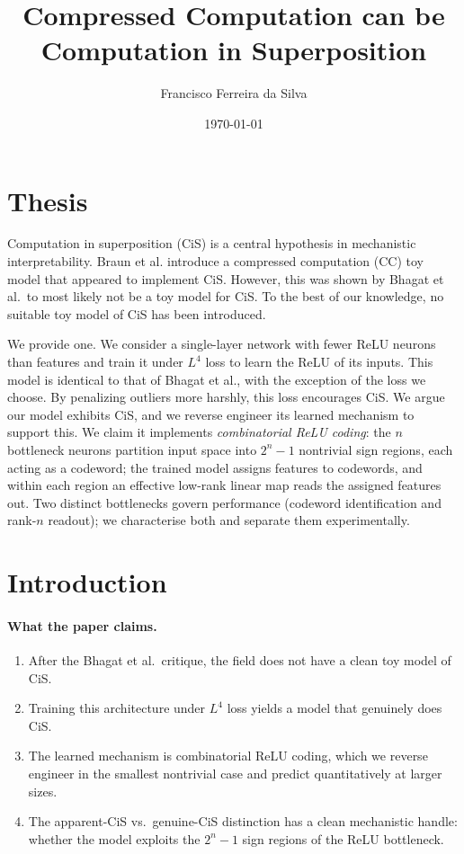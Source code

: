 \documentclass[11pt]{article}
\title{Compressed Computation can be Computation in Superposition}
\author{Francisco Ferreira da Silva}
\date{\today}
\begin{document}
\maketitle

\section*{Thesis}

Computation in superposition (CiS) is a central hypothesis in mechanistic interpretability.
Braun et al. introduce a compressed computation (CC) toy model that appeared to implement CiS.
However, this was shown by Bhagat et al.\ to most likely not be a toy model for CiS.
To the best of our knowledge, no suitable toy model of CiS has been introduced.

We provide one.
We consider a single-layer network with fewer ReLU neurons than features and train it under $L^4$ loss to learn the ReLU of its inputs.
This model is identical to that of Bhagat et al., with the exception of the loss we choose.
By penalizing outliers more harshly, this loss encourages CiS.
We argue our model exhibits CiS, and we reverse engineer its learned mechanism to support this.
We claim it implements \emph{combinatorial ReLU coding}: the $n$ bottleneck neurons partition input space into $2^n - 1$ nontrivial sign regions, each acting as a codeword; the trained model assigns features to codewords, and within each region an effective low-rank linear map reads the assigned features out. Two distinct bottlenecks govern performance (codeword identification and rank-$n$ readout); we characterise both and separate them experimentally.

\section{Introduction}

\paragraph{What the paper claims.}
\begin{enumerate}
\item After the Bhagat et al.\ critique, the field does not have a clean toy model of CiS.
\item Training this architecture under $L^4$ loss yields a model that genuinely does CiS.
\item The learned mechanism is combinatorial ReLU coding, which we reverse engineer in the smallest nontrivial case and predict quantitatively at larger sizes.
\item The apparent-CiS vs.\ genuine-CiS distinction has a clean mechanistic handle: whether the model exploits the $2^n - 1$ sign regions of the ReLU bottleneck.
\end{enumerate}
\end{document}
